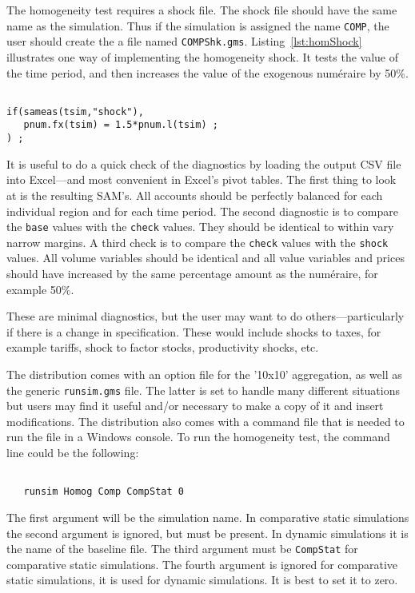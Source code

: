 The homogeneity test requires a shock file. The shock file should have the same
name as the simulation. Thus if the simulation is assigned the name
\texttt{COMP}, the user should create the a file named \texttt{COMPShk.gms}.
Listing~\ref{lst:homShock} illustrates one way of implementing the homogeneity
shock. It tests the value of the time period, and then increases the value of
the exogenous {num\'eraire} by 50\%.

\begin{lstlisting}[language=GAMS, caption={Homogeneity shock}, label=lst:homShock]

if(sameas(tsim,"shock"),
   pnum.fx(tsim) = 1.5*pnum.l(tsim) ;
) ;

\end{lstlisting}

It is useful to do a quick check of the diagnostics by loading the output CSV
file into Excel---and most convenient in Excel's pivot tables. The first thing
to look at is the resulting SAM's. All accounts should be perfectly balanced for
each individual region and for each time period. The second diagnostic is to
compare the \texttt{base} values with the \texttt{check} values. They should be
identical to within vary narrow margins. A third check is to compare the
\texttt{check} values with the \texttt{shock} values. All volume variables
should be identical and all value variables and prices should have increased by
the same percentage amount as the {num\'eraire}, for example 50\%.

These are minimal diagnostics, but the user may want to do others---particularly
if there is a change in specification. These would include shocks to taxes, for
example tariffs, shock to factor stocks, productivity shocks, etc.

The distribution comes with an option file for the '10x10' aggregation, as well
as the generic \texttt{runsim.gms} file. The latter is set to handle many
different situations but users may find it useful and/or necessary to make a
copy of it and insert modifications. The distribution also comes with a command
file that is needed to run the file in a Windows console. To run the homogeneity
test, the command line could be the following:

\begin{verbatim}

   runsim Homog Comp CompStat 0

\end{verbatim}

\noindent The first argument will be the simulation name. In comparative static
simulations the second argument is ignored, but must be present. In dynamic
simulations it is the name of the baseline file. The third argument must be
\texttt{CompStat} for comparative static simulations. The fourth argument is
ignored for comparative static simulations, it is used for dynamic simulations.
It is best to set it to zero.

